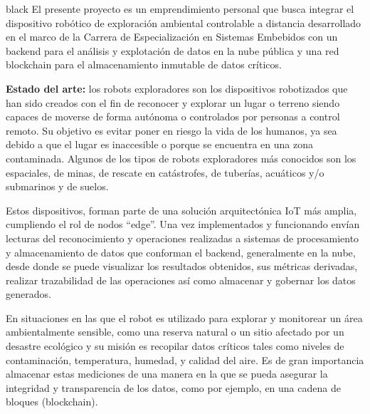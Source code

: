 \documentclass[
11pt, %
]{charter}
\begin{document}
\begin{consigna}{black} %
El presente proyecto es un emprendimiento personal que busca integrar el dispositivo robótico de exploración ambiental controlable a distancia desarrollado en el marco de la Carrera de Especialización en Sistemas Embebidos con un backend para el análisis y explotación de datos en la nube pública y una red blockchain para el almacenamiento inmutable de datos críticos.

\textbf{Estado del arte:}
los robots exploradores son los dispositivos robotizados que han sido creados con el fin de reconocer y explorar un lugar o terreno siendo capaces de moverse de forma autónoma o controlados por personas a control remoto. Su objetivo es evitar poner en riesgo la vida de los humanos, ya sea debido a que el lugar es inaccesible o porque se encuentra en una zona contaminada.
Algunos de los tipos de robots exploradores más conocidos son los espaciales, de minas, de rescate en catástrofes, de tuberías, acuáticos y/o submarinos y de suelos.

Estos dispositivos, forman parte de una solución arquitectónica IoT más amplia, cumpliendo el rol de nodos “edge”.  Una vez implementados y funcionando envían lecturas del reconocimiento y operaciones realizadas a sistemas de procesamiento y almacenamiento de datos que conforman el backend, generalmente en la nube, desde donde se puede visualizar los resultados obtenidos, sus métricas derivadas, realizar trazabilidad de las operaciones así como almacenar y gobernar los datos generados.

En situaciones en las que el robot es utilizado para explorar y monitorear un área ambientalmente sensible, como una reserva natural o un sitio afectado por un desastre ecológico y su misión es recopilar datos críticos tales como niveles de contaminación, temperatura, humedad, y calidad del aire. Es de gran importancia almacenar estas mediciones de una manera en la que se pueda asegurar la integridad y transparencia de los datos, como por ejemplo, en una cadena de bloques (blockchain).


\end{consigna}
\end{document}
